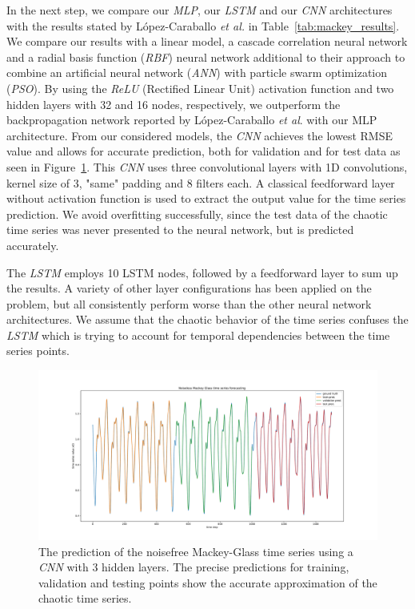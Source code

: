 In the next step, we compare our \emph{MLP}, our \emph{LSTM} and our \emph{CNN}
architectures with the results stated by López-Caraballo \textit{et al.}
\cite{lopez2016} in Table~\ref{tab:mackey_results}. We
compare our results with a linear model, a cascade correlation neural network
and a radial basis function (\emph{RBF})
neural network additional to their approach to
combine an artificial neural network (\emph{ANN}) with particle swarm
optimization (\emph{PSO}). By
using the \emph{ReLU} (Rectified Linear Unit) activation function and two
hidden layers with 32 and 16 nodes, respectively, we outperform the
backpropagation network reported by López-Caraballo \textit{et al}. with our 
MLP architecture.
From our considered models, the \emph{CNN} achieves the lowest RMSE value and
allows for accurate prediction, both for validation and for test data as seen
in Figure~\ref{fig:mackey_pred}. This \emph{CNN} uses three convolutional layers
with 1D convolutions, kernel size of 3, "same" padding and 8
filters each. A classical
feedforward layer without activation function is used to extract the output
value for the time series prediction. We avoid overfitting successfully, since
the test data of the chaotic time series was never presented to the neural
network, but is predicted accurately.

The \emph{LSTM} employs 10 LSTM nodes, followed by a feedforward layer to sum up
the results. A variety of other layer configurations has been applied
on the problem,
but all consistently perform worse than the other neural network architectures.
We assume that the chaotic behavior of the time series confuses the \emph{LSTM}
which is trying to account for temporal dependencies between the time series
points.

\begin{figure}
    \centering
    \includegraphics[width=\textwidth]{figures/mg_pred_cnn.pdf}
    \caption{The prediction of the noisefree Mackey-Glass time series using a
        \emph{CNN} with $3$ hidden layers.
        The precise predictions for training, validation and testing
        points show the accurate approximation of the chaotic time series.}
    \label{fig:mackey_pred}
\end{figure}

